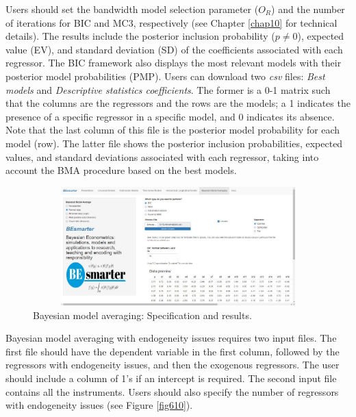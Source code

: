 Users should set the bandwidth model selection parameter ($O_R$) and the number of iterations for BIC and MC3, respectively (see Chapter \ref{chap10} for technical details). The results include the posterior inclusion probability ($p \neq 0$), expected value (EV), and standard deviation (SD) of the coefficients associated with each regressor. The BIC framework also displays the most relevant models with their posterior model probabilities (PMP). Users can download two \textit{csv} files: \textit{Best models} and \textit{Descriptive statistics coefficients}. The former is a 0-1 matrix such that the columns are the regressors and the rows are the models; a 1 indicates the presence of a specific regressor in a specific model, and 0 indicates its absence. Note that the last column of this file is the posterior model probability for each model (row). The latter file shows the posterior inclusion probabilities, expected values, and standard deviations associated with each regressor, taking into account the BMA procedure based on the best models.

\begin{figure}
	\includegraphics[width=340pt, height=130pt]{Chapters/chapterGUI/figures/Figure9.jpg}
	\caption[List of figure caption goes here]{Bayesian model averaging: Specification and results.}\label{fig69}
\end{figure} 

Bayesian model averaging with endogeneity issues requires two input files. The first file should have the dependent variable in the first column, followed by the regressors with endogeneity issues, and then the exogenous regressors. The user should include a column of 1's if an intercept is required. The second input file contains all the instruments. Users should also specify the number of regressors with endogeneity issues (see Figure \ref{fig610}).

